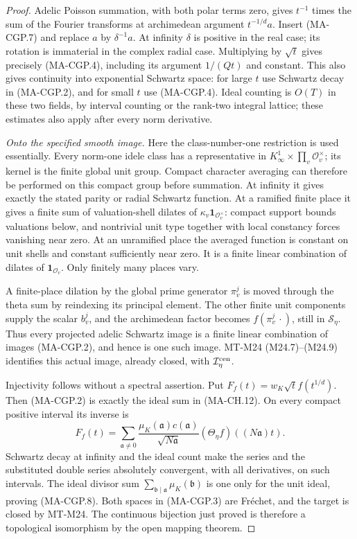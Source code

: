\begin{proof}
Adelic Poisson summation, with both polar terms zero, gives
$t^{-1}$ times the sum of the Fourier transforms at archimedean
argument $t^{-1/d}a$.  Insert (MA-CGP.7) and replace
$a$ by $\delta^{-1}a$.  At infinity $\delta$ is positive
in the real case; its rotation is immaterial in the complex
radial case.  Multiplying by $\sqrt t$ gives precisely
(MA-CGP.4), including its argument $1/(Qt)$ and constant.
This also gives continuity into exponential Schwartz space:
for large $t$ use Schwartz decay in (MA-CGP.2), and for small
$t$ use (MA-CGP.4).  Ideal counting is $O(T)$ in these two
fields, by interval counting or the rank-two integral lattice;
these estimates also apply after every norm derivative.

\emph{Onto the specified smooth image.}
Here the class-number-one restriction is used essentially.
Every norm-one idele class has a representative in
$K_\infty^1\times\prod_v\mathcal O_v^\times$; its kernel
is the finite global unit group.  Compact character averaging
can therefore be performed on this compact group before
summation.  At infinity it gives exactly the stated parity or
radial Schwartz function.  At a ramified finite place it gives
a finite sum of valuation-shell dilates of
$\kappa_v\mathbf1_{\mathcal O_v^\times}$: compact support
bounds valuations below, and nontrivial unit type together
with local constancy forces vanishing near zero.
At an unramified place the averaged function is constant
on unit shells and constant sufficiently near zero.  It is
a finite linear combination of dilates of
$\mathbf1_{\mathcal O_v}$.  Only finitely many places vary.

A finite-place dilation by the global prime generator
$\pi_v^j$ is moved through the theta sum by reindexing its
principal element.  The other finite unit components supply
the scalar $b_v^j$, and the archimedean factor becomes
$f(\pi_v^j\,\cdot)$, still in $\mathscr S_\eta$.
Thus every projected adelic Schwartz image is a finite linear
combination of images (MA-CGP.2), and hence is one such image.
MT-M24 (M24.7)--(M24.9) identifies this actual image, already
closed, with $\mathcal I_\eta^{\rm cen}$.

Injectivity follows without a spectral assertion.  Put
$F_f(t)=w_K\sqrt t f(t^{1/d})$.
Then (MA-CGP.2) is exactly the ideal sum in (MA-CH.12).
On every compact positive interval its inverse is
\[
 F_f(t)=\sum_{\mathfrak a\ne0}
      \frac{\mu_K(\mathfrak a)c(\mathfrak a)}{\sqrt{N\mathfrak a}}
                   (\Theta_\eta f)((N\mathfrak a)t).
 \tag{MA-CGP.8}
\]
Schwartz decay at infinity and the ideal count make the
series and the substituted double series absolutely convergent,
with all derivatives, on such intervals.  The ideal divisor
sum $\sum_{\mathfrak b\mid\mathfrak a}\mu_K(\mathfrak b)$
is one only for the unit ideal, proving (MA-CGP.8).
Both spaces in (MA-CGP.3) are Fr\'echet, and the target is
closed by MT-M24.  The continuous bijection just proved is
therefore a topological isomorphism by the open mapping theorem.
\end{proof}

